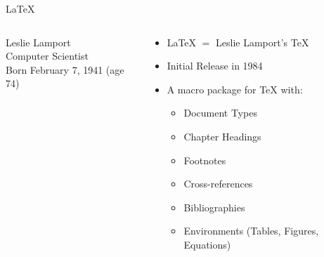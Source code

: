 \begin{frame}{\LaTeX{}}
\begin{columns}
\begin{column}{4cm}
\begin{figure}
\end{figure}
\begin{center}
\tiny
Leslie Lamport \\
Computer Scientist \\
Born February 7, 1941 (age 74) \\
\end{center}
\end{column}
\begin{column}{6cm}
\begin{itemize}
\item \LaTeX{} $=$ Leslie Lamport's \TeX{}
\pause
\item Initial Release in 1984
\pause
\item A macro package for \TeX{} with:
\begin{itemize}
\item Document Types
\item Chapter Headings
\item Footnotes
\item Cross-references
\item Bibliographies
\item Environments (Tables, Figures, Equations)
\end{itemize}
\end{itemize}
\end{column}
\end{columns}
\end{frame}





